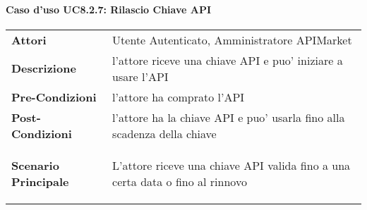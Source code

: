 \paragraph{Caso d'uso UC8.2.7: Rilascio Chiave API}
\label{UC8.2.7}

\renewcommand*{\arraystretch}{1.6}
\begin{longtable}{ l | p{11cm}}
	\hline
	\rowcolor{Gray}
	\multicolumn{2}{c}{UC8.2.7: Rilascio Chiave API} \\
	\hline
	\textbf{Attori} &Utente Autenticato, Amministratore APIMarket \\
	\textbf{Descrizione} & l'attore riceve una chiave API e puo' iniziare a usare l'API \\
	\textbf{Pre-Condizioni} &  l'attore ha comprato l'API\\
	\textbf{Post-Condizioni}& l'attore ha la chiave API e puo' usarla fino alla scadenza della chiave\\
	\textbf{Scenario Principale} & \begin{enumerate*}[label=(\arabic*.),itemjoin={\newline}]
		\item L'attore riceve una chiave API valida fino a una certa data o fino al rinnovo
	\end{enumerate*}\\
\end{longtable}
